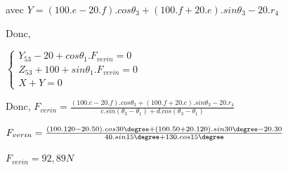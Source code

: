 avec $Y=(100.e-20.f).cos\theta_3+(100.f+20.e).sin\theta_3-20.r_4$

Donc,

$\left\{\begin{array}{l}
Y_{53}-20+cos\theta_1.F_{verin}=0 \\
Z_{53}+100+sin\theta_1.F_{verin}=0 \\
X+Y=0
\end{array}\right.$

Donc, $F_{verin}=\frac{(100.e-20.f).cos\theta_3+(100.f+20.e).sin\theta_3-20.r_4}{c.sin(\theta_3-\theta_1)+d.cos(\theta_3-\theta_1)}$

$F_{verin}=\frac{(100.120-20.50).cos30\degree+(100.50+20.120).sin30\degree-20.30}{40.sin15\degree+130.cos15\degree}$

$F_{verin}=92,89N$


